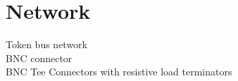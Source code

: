 \section{Network}
Token bus network\\
BNC connector\\
BNC Tee Connectors with resistive load terminators\\
